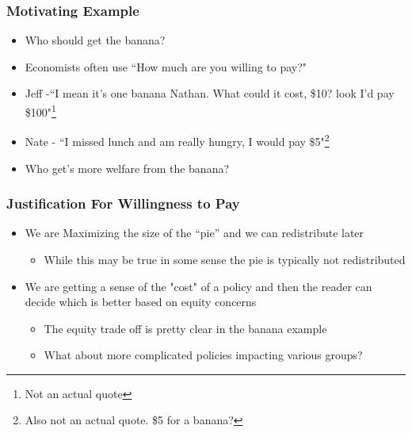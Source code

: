 \documentclass{beamer}
\begin{document}
\begin{frame}
\frametitle{Motivating Example}

\begin{itemize}
	\setlength{\itemsep}{5mm}
	\large
	\item Who should get the banana? 
	
	\item Economists often use ``How much are you willing to pay?" 
	
	\item Jeff -``I mean it’s one banana Nathan. What could it cost, \$10? look I'd pay \$100"\footnote[frame]{Not an actual quote} 
	
	\item Nate - ``I missed lunch and am really hungry, I would pay \$5"\footnote[frame]{Also not an actual quote. \$5 for a banana?} 
	
	\item Who get's more welfare from the banana?
\end{itemize}

\end{frame}



\begin{frame}
\frametitle{Justification For Willingness to Pay}

\begin{itemize}
	\setlength{\itemsep}{5mm}
	\large 
	\item We are Maximizing the size of the “pie” and we can redistribute later 
	\begin{itemize}
			\setlength{\itemsep}{5mm}
		\large
		\item While this may be true in some sense the pie is typically not redistributed
	\end{itemize}
	\item  We are getting a sense of the "cost" of a policy and then the reader can decide which is better based on equity concerns 
	\begin{itemize}
			\setlength{\itemsep}{5mm}
		\large
		\item The equity trade off is pretty clear in the banana example 
		\item What about more complicated policies impacting various groups? 
	\end{itemize}
\end{itemize}


\end{frame}
\end{document}
